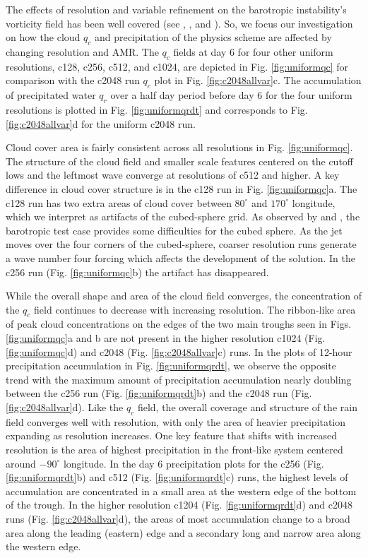 \documentclass{ametsoc}
\begin{document}
The effects of resolution and variable refinement on the barotropic instability's vorticity
field has been well covered (see \cite{st2007comparison}, \cite{Weller:2009gl}, 
and \cite{scott2016test}). So, we focus our investigation on how the cloud $q_c$ and precipitation of the physics scheme are affected by changing resolution
and AMR. The $q_c$ fields at day 6 for four other uniform resolutions, c128, c256, c512, and
c1024, are depicted in Fig. \ref{fig:uniformqc} for comparison with the c2048 run $q_c$ plot 
in Fig. \ref{fig:c2048allvar}c. The accumulation of precipitated water $q_r$ over
a half day period before day 6 for the four uniform resolutions is plotted in Fig. \ref{fig:uniformqrdt}
and corresponds to Fig. \ref{fig:c2048allvar}d for the uniform c2048 run.

Cloud cover area is fairly consistent across all resolutions in Fig. \ref{fig:uniformqc}.
The structure of the cloud field and smaller scale features centered on the cutoff 
lows and the leftmost wave converge at resolutions of c512 and higher. A key
difference in cloud cover structure is in the c128 run in Fig. \ref{fig:uniformqc}a.
The c128 run has two extra areas of cloud cover between $80^\circ$ and
$170^\circ$ longitude, which we interpret as artifacts of the cubed-sphere grid.
As observed by \cite{st2007comparison} and \cite{ullrich:2010vn}, the barotropic
test case provides some difficulties for the cubed sphere. As the jet moves over the four corners of the cubed-sphere, coarser resolution runs generate a wave number
four forcing which affects the development of the solution. In the c256 run (Fig. \ref{fig:uniformqc}b) 
the artifact has disappeared.

While the overall shape and area of the cloud field converges, the concentration
of the $q_c$ field continues to decrease with increasing resolution.
The ribbon-like area of peak cloud concentrations on the edges of the two main troughs
seen in Figs. \ref{fig:uniformqc}a and b are not present in the higher resolution c1024
(Fig. \ref{fig:uniformqc}d) and c2048 (Fig. \ref{fig:c2048allvar}c) runs. In the
plots of 12-hour precipitation accumulation in Fig. \ref{fig:uniformqrdt}, we
observe the opposite trend with the maximum amount of precipitation accumulation 
nearly doubling between the c256 run (Fig. \ref{fig:uniformqrdt}b) and the
c2048 run (Fig. \ref{fig:c2048allvar}d). Like the $q_c$ field, the overall coverage and 
structure of the rain field converges well with resolution, with only the area of 
heavier precipitation expanding as resolution increases. One key feature that
shifts with increased resolution is the area of highest precipitation 
in the front-like system centered around $-90^\circ$ longitude. In the day 6 
precipitation plots for the c256 (Fig. \ref{fig:uniformqrdt}b) and c512 
(Fig. \ref{fig:uniformqrdt}c) runs, the highest levels of accumulation
are concentrated in a small area at the western edge of the bottom
of the trough. In the higher resolution c1204 (Fig. \ref{fig:uniformqrdt}d)
and c2048 runs (Fig. \ref{fig:c2048allvar}d), the areas of most accumulation 
change to a broad area along the leading (eastern) edge and
a secondary long and narrow area along the western edge.
\end{document}
